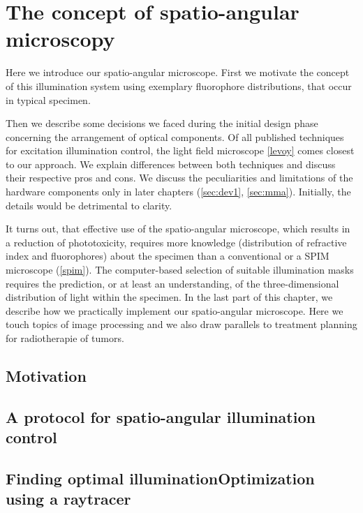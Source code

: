 \chapter{The concept of spatio-angular microscopy}
\label{sec:concept}
\begin{summary}
  Here we introduce our spatio-angular microscope. First we motivate
  the concept of this illumination system using 
  exemplary fluorophore distributions, that occur
  in typical specimen.

  Then we describe some decisions we faced during the initial design
  phase concerning the arrangement of optical components. Of all published
  techniques for excitation illumination control, the light field
  microscope \ref{levoy} comes closest to our approach.
  We explain differences between both techniques and discuss their
  respective pros and cons. 
  We discuss the peculiarities and limitations of the hardware components
  only in later chapters (\ref{sec:dev1}, \ref{sec:mma}).
  Initially, the details would be detrimental to clarity.

  It turns out, that effective use of the
  spatio-angular microscope, which results in a
  reduction of phototoxicity, requires more knowledge (distribution of refractive index and fluorophores)
  about the specimen than a conventional or a SPIM microscope
  (\ref{spim}). 
  The computer-based selection of suitable illumination masks requires the
  prediction, or at least an understanding, of the three-dimensional
  distribution of light within the specimen.
  In the last part of this
  chapter, we describe how we practically implement our spatio-angular
  microscope. Here we touch topics of image processing and we also draw
  parallels to treatment planning for radiotherapie of tumors.
\end{summary}
\section{Motivation}
\section{A protocol for spatio-angular illumination control}
\section{Finding optimal illuminationOptimization using a raytracer}
